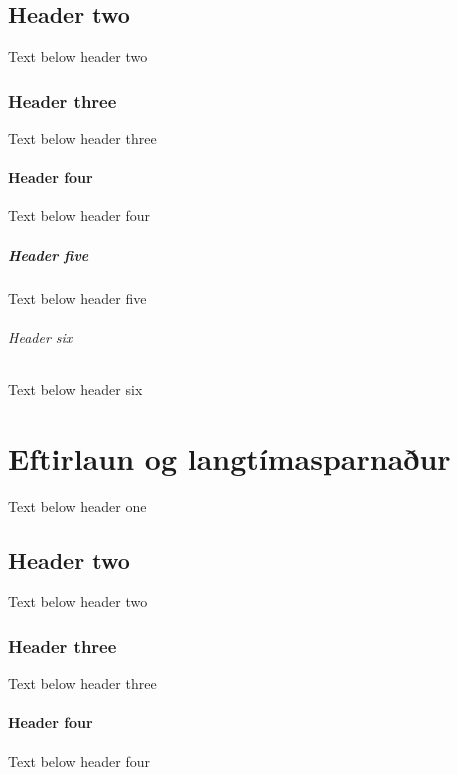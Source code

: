 \documentclass[a4paper,10pt,icelandic]{sphinxmanual}
\begin{document}
\section{Header two}
\label{\detokenize{skattamal/index:header-two}}
\sphinxAtStartPar
Text below header two


\subsection{Header three}
\label{\detokenize{skattamal/index:header-three}}
\sphinxAtStartPar
Text below header three


\subsubsection{Header four}
\label{\detokenize{skattamal/index:header-four}}
\sphinxAtStartPar
Text below header four


\paragraph{Header five}
\label{\detokenize{skattamal/index:header-five}}
\sphinxAtStartPar
Text below header five


\subparagraph{Header six}
\label{\detokenize{skattamal/index:header-six}}
\sphinxAtStartPar
Text below header six

\sphinxstepscope


\chapter{Eftirlaun og langtímasparnaður}
\label{\detokenize{eftirlaun-og-langtimassparnadur/index:eftirlaun-og-langtimasparnaur}}\label{\detokenize{eftirlaun-og-langtimassparnadur/index::doc}}
\sphinxAtStartPar
Text below header one


\section{Header two}
\label{\detokenize{eftirlaun-og-langtimassparnadur/index:header-two}}
\sphinxAtStartPar
Text below header two


\subsection{Header three}
\label{\detokenize{eftirlaun-og-langtimassparnadur/index:header-three}}
\sphinxAtStartPar
Text below header three


\subsubsection{Header four}
\label{\detokenize{eftirlaun-og-langtimassparnadur/index:header-four}}
\sphinxAtStartPar
Text below header four
\end{document}
